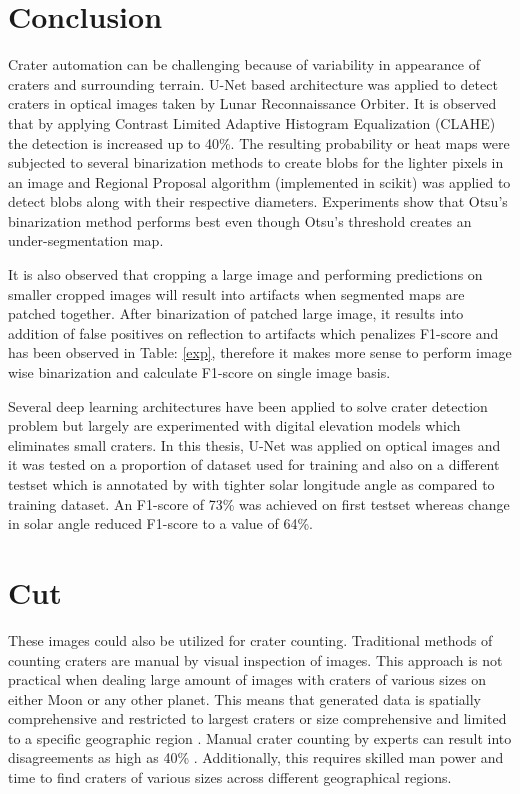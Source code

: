 \documentclass[11pt]{article}
\begin{document}
\section{Conclusion}
Crater automation can be challenging because of variability in appearance of craters and surrounding terrain. U-Net based architecture was applied to detect craters in optical images taken by Lunar Reconnaissance Orbiter. It is observed that by applying Contrast Limited Adaptive Histogram Equalization (CLAHE) the detection is increased up to 40\%. The resulting probability or heat maps were subjected to several binarization methods to create blobs for the lighter pixels in an image and Regional Proposal algorithm (implemented in scikit) was applied to detect blobs along with their respective diameters. Experiments show that Otsu's binarization method performs best even though Otsu's threshold creates an under-segmentation map. 

It is also observed that cropping a large image and performing predictions on smaller cropped images will result into artifacts when segmented maps are patched together. After binarization of patched large image, it results into addition of false positives on reflection to artifacts which penalizes F1-score and has been observed in Table: \ref{exp}, therefore it makes more sense to perform image wise binarization and calculate F1-score on single image basis.

Several deep learning architectures have been applied to solve crater detection problem but largely are experimented with digital elevation models which eliminates small craters. In this thesis, U-Net was applied on optical images and it was tested on a proportion of dataset used for training and also on a different testset which is annotated by \cite{dino2020} with tighter solar longitude angle as compared to training dataset. An F1-score of 73\% was achieved on first testset whereas change in solar angle reduced F1-score to a value of 64\%.


\section{Cut}
These images could also be utilized for crater counting. Traditional methods of counting craters are manual by visual inspection of images. This approach is not practical when dealing large amount of images with craters of various sizes on either Moon or any other planet. This means that generated data is spatially comprehensive and restricted to largest craters or size comprehensive and limited to a specific geographic region \cite{stepinski2012detecting}. Manual crater counting by experts can result into disagreements as high as 40\% \cite{greeley1970precision}. Additionally, this requires skilled man power and time to find craters of various sizes across different geographical regions.

\newpage
\clearpage




	


\end{document}
